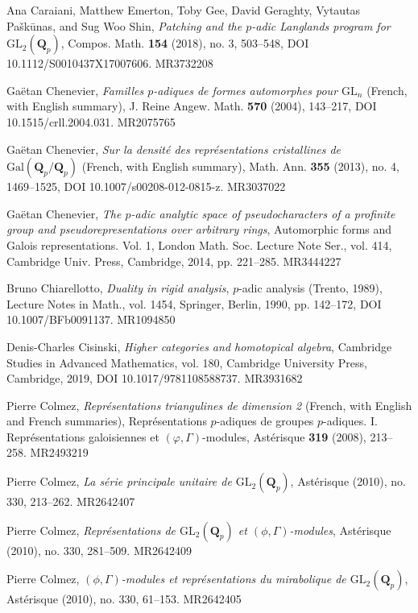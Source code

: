 \item[{[CEG+18]}] Ana Caraiani, Matthew Emerton, Toby Gee, David Geraghty, Vytautas Pa\v{s}k\={u}nas, and Sug Woo Shin, \emph{Patching and the $p$-adic Langlands program for $\mathrm{GL}_2(\mathbf{Q}_p)$}, Compos. Math. \textbf{154} (2018), no. 3, 503--548, DOI 10.1112/S0010437X17007606. MR3732208
\item[{[Che04]}] Ga\"etan Chenevier, \emph{Familles $p$-adiques de formes automorphes pour $\mathrm{GL}_n$} (French, with English summary), J. Reine Angew. Math. \textbf{570} (2004), 143--217, DOI 10.1515/crll.2004.031. MR2075765
\item[{[Che13]}] Ga\"etan Chenevier, \emph{Sur la densit\'e des repr\'esentations cristallines de $\mathrm{Gal}(\mathbf{Q}_p/\mathbf{Q}_p)$} (French, with English summary), Math. Ann. \textbf{355} (2013), no. 4, 1469--1525, DOI 10.1007/s00208-012-0815-z. MR3037022
\item[{[Che14]}] Ga\"etan Chenevier, \emph{The $p$-adic analytic space of pseudocharacters of a profinite group and pseudorepresentations over arbitrary rings}, Automorphic forms and Galois representations. Vol. 1, London Math. Soc. Lecture Note Ser., vol. 414, Cambridge Univ. Press, Cambridge, 2014, pp. 221--285. MR3444227
\item[{[Chi90]}] Bruno Chiarellotto, \emph{Duality in rigid analysis}, $p$-adic analysis (Trento, 1989), Lecture Notes in Math., vol. 1454, Springer, Berlin, 1990, pp. 142--172, DOI 10.1007/BFb0091137. MR1094850
\item[{[Cis19]}] Denis-Charles Cisinski, \emph{Higher categories and homotopical algebra}, Cambridge Studies in Advanced Mathematics, vol. 180, Cambridge University Press, Cambridge, 2019, DOI 10.1017/9781108588737. MR3931682
\item[{[Col08]}] Pierre Colmez, \emph{Repr\'esentations triangulines de dimension 2} (French, with English and French summaries), Repr\'esentations $p$-adiques de groupes $p$-adiques. I. Repr\'esentations galoisiennes et $(\varphi,\Gamma)$-modules, Ast\'erisque \textbf{319} (2008), 213--258. MR2493219
\item[{[Col10a]}] Pierre Colmez, \emph{La s\'erie principale unitaire de $\mathrm{GL}_2(\mathbf{Q}_p)$}, Ast\'erisque (2010), no. 330, 213--262. MR2642407
\item[{[Col10b]}] Pierre Colmez, \emph{Repr\'esentations de $\mathrm{GL}_2(\mathbf{Q}_p)$ et $(\phi,\Gamma)$-modules}, Ast\'erisque (2010), no. 330, 281--509. MR2642409
\item[{[Col10c]}] Pierre Colmez, \emph{$(\phi,\Gamma)$-modules et repr\'esentations du mirabolique de $\mathrm{GL}_2(\mathbf{Q}_p)$}, Ast\'erisque (2010), no. 330, 61--153. MR2642405
